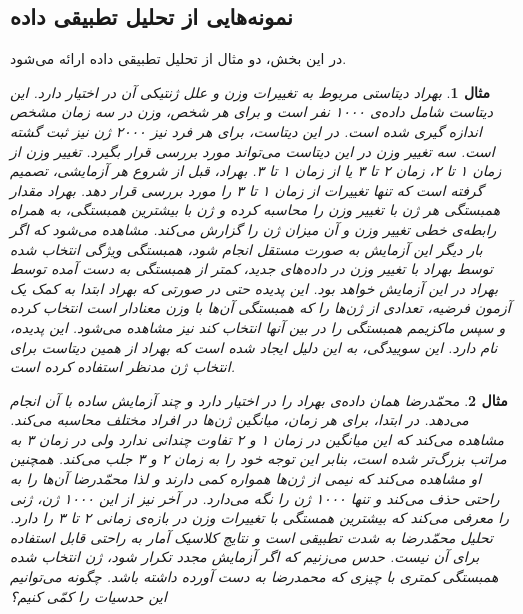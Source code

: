 \documentclass[a4paper,12pt]{article}
\newtheorem{exa}{{\large\bf مثال}}[section]
\begin{document}
	\subsection{نمونه‌هایی از تحلیل تطبیقی داده}
	در این بخش، دو مثال از تحلیل تطبیقی داده ارائه می‌شود.
	\begin{exa}
		\label{ex1}
		بهراد دیتاستی مربوط به تغییرات وزن و علل ژنتیکی آن در اختیار دارد. این دیتاست شامل داده‌ی ۱۰۰۰ نفر است و برای هر شخص، وزن در سه زمان مشخص اندازه گیری شده است. در این دیتاست،  برای هر فرد نیز
		۲۰۰۰ ژن نیز ثبت گشته است. سه تغییر وزن در این دیتاست می‌تواند مورد بررسی قرار بگیرد. تغییر وزن از زمان ۱ تا ۲، زمان ۲ تا ۳ یا از زمان ۱ تا ۳. بهراد، قبل از شروع هر آزمایشی، تصمیم گرفته است که تنها تغییرات از زمان ۱ تا ۳ را مورد بررسی قرار دهد. بهراد مقدار همبستگی هر ژن با تغییر وزن را محاسبه کرده و ژن با بیشترین همبستگی، به همراه 
		رابطه‌ی  خطی  تغییر وزن و آن میزان 
		ژن را گزارش می‌کند. مشاهده‌ می‌شود که اگر بار دیگر این آزمایش به صورت مستقل انجام شود، همبستگی ویژگی انتخاب شده توسط بهراد با تغییر وزن در داده‌های جدید، کمتر از همبستگی به دست آمده توسط بهراد  در این آزمایش خواهد بود. این پدیده‌ حتی در صورتی که بهراد ابتدا به کمک یک آزمون فرضیه، تعدادی از ژن‌ها را که همبستگی آن‌ها با وزن معنادار است انتخاب کرده و سپس ماکزیمم همبستگی را در بین آنها انتخاب کند نیز مشاهده می‌شود.  این پدیده‌،
		نام دارد. این سوییدگی، به این دلیل ایجاد شده است که بهراد از همین دیتاست برای انتخاب ژن مدنظر استفاده کرده است.
	\end{exa}
	
	\begin{exa}
		\label{ex2}
		محمّدرضا همان داده‌ی بهراد را در اختیار دارد و چند آزمایش ساده با آن انجام می‌دهد. در ابتدا، برای هر زمان، میانگین 
		ژن‌ها در افراد مختلف محاسبه می‌کند. مشاهده می‌کند که این میانگین در زمان ۱ و ۲ تفاوت چندانی ندارد ولی در زمان ۳ به مراتب بزرگ‌تر شده است، بنابر این توجه خود را به زمان ۲ و ۳ جلب می‌کند. همچنین او مشاهده‌ می‌کند که نیمی از ژن‌ها همواره 
		کمی دارند و لذا محمّد‌رضا آن‌ها را به راحتی حذف می‌کند و تنها ۱۰۰۰ ژن را نگه می‌دارد. در آخر نیز از این ۱۰۰۰ ژن، ژنی را معرفی می‌کند که بیشترین همستگی با تغییرات وزن در بازه‌‌ی زمانی ۲ تا ۳ را دارد. تحلیل محمّدرضا به شدت تطبیقی است و نتایج کلاسیک آمار به راحتی قابل استفاده برای آن نیست. حدس می‌زنیم که اگر آزمایش مجدد تکرار شود، ژن انتخاب شده همبستگی کمتری با چیزی که محمدرضا به دست آورده داشته باشد. چگونه می‌توانیم این حدسیات را کمّی کنیم؟
	\end{exa}
	
\end{document}
